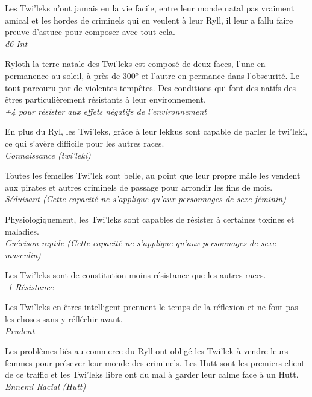 \begin{description}[align=left]
\item [Rusé \& Astucieux] 			%
		Les Twi'leks n'ont jamais eu la vie facile, entre leur monde natal pas vraiment amical et les hordes de criminels qui en veulent à leur Ryll, il leur a fallu faire preuve d'astuce pour composer avec tout cela.\\
		\emph{d6 Int}
\item [Ni chaud ni froid] 			%
		Ryloth la terre natale des Twi'leks est composé de deux faces, l'une en permanence au soleil, à près de 300° et l'autre en permance dans l'obscurité. Le tout parcouru par de violentes tempêtes. Des conditions qui font des natifs des êtres particulièrement résistants à leur environnement.\\
		\emph{+4 pour résister aux effets négatifs de l’environnement}
\item [Lekkus Speaking] 			%
		En plus du Ryl, les Twi'leks, grâce à leur lekkus sont capable de parler le twi'leki, ce qui s'avère difficile pour les autres races.\\
		\emph{Connaissance (twi'leki)}
\item [Belle plante (Femelles)] 	%
		Toutes les femelles Twi'lek sont belle, au point que leur propre mâle les vendent aux pirates et autres criminels de passage pour arrondir les fins de mois.\\
		\emph{Séduisant (Cette capacité ne s'applique qu'aux personnages de sexe féminin)}
\item [Immunisé (Mâles)] 			%
		Physiologiquement, les Twi'leks sont capables de résister à certaines toxines et maladies.\\
		\emph{Guérison rapide (Cette capacité ne s'applique qu'aux personnages de sexe masculin)}
\item [Frêles] 						%
		Les Twi'leks sont de constitution moins résistance que les autres races.\\
		\emph{-1 Résistance}
\item [Prudent] 					%
		Les Twi'leks en êtres intelligent prennent le temps de la réflexion et ne font pas les choses sans y réfléchir avant.\\
		\emph{Prudent}
\item [Hutt(er)] 					%
		Les problèmes liés au commerce du Ryll ont obligé les Twi'lek à vendre leurs femmes pour présever leur monde des criminels. Les Hutt sont les premiers client de ce traffic et les Twi'leks libre ont du mal à garder leur calme face à un Hutt.\\
		\emph{Ennemi Racial (Hutt)}
\end{description}